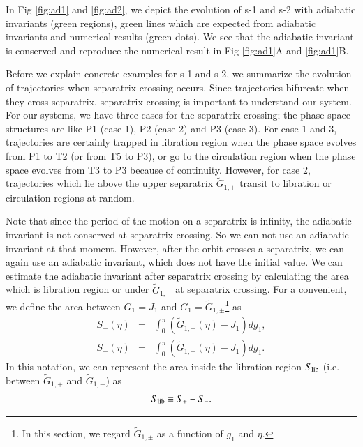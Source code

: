 \documentclass[useAMS,usenatbib,twocolumn]{mn2e}
\newcommand{\beqa}{\begin{eqnarray}}
\newcommand{\eeqa}{\end{eqnarray}}
\begin{document}
In Fig \ref{fig:ad1} and \ref{fig:ad2}, we depict
the evolution of s-1 and s-2 with adiabatic invariants (green
regions), green lines which are expected from adiabatic invariants and numerical results (green dots).
We see that the adiabatic invariant is conserved and reproduce the numerical result in Fig \ref{fig:ad1}A and \ref{fig:ad1}B.

Before we explain concrete examples for s-1 and s-2, we summarize the evolution of trajectories when separatrix crossing occurs. 
Since trajectories bifurcate when they cross separatrix, separatrix crossing is important to understand our system.
For our systems, we have three cases for the separatrix crossing; 
the phase space structures are like P1 (case 1), P2 (case 2) and P3 (case 3).
For case 1 and 3, trajectories are certainly trapped in libration region when the phase space evolves from P1 to T2 (or from T5 to P3), or go to the circulation region when the phase space evolves from T3 to P3 because of continuity.
However, for case 2, trajectories which lie above the upper separatrix $\tilde{G}_{1,+}$ transit to libration or circulation regions at random.

Note that since the period of the motion on a separatrix is infinity,
the adiabatic invariant is not conserved at separatrix crossing. 
So we can not use an adiabatic invariant at that moment.
However, after the orbit crosses a separatrix, we can again use
an adiabatic invariant, which does not have the initial value.
We can estimate the adiabatic invariant after separatrix crossing 
by calculating the area which is libration region or under $\tilde{G}_{1,-}$ at separatrix crossing.
For a convenient, we define the
area between $G_1=J_1$ and
$G_1=\tilde{G}_{1,\pm}$\footnote[1]{In this section, we regard
$\tilde{G}_{1, \pm}$ as a function of $g_1$ and $\eta$.}
as 
\beqa
S_{+}(\eta)&=&\int_{0}^{\pi} (\tilde{G}_{1,+}(\eta) - J_1) dg_{1},\\
S_{-}(\eta)&=&\int_{0}^{\pi} (\tilde{G}_{1, -}(\eta) - J_1) dg_{1}.
\eeqa
In this notation, we can represent the area inside the libration region $S_{\rm lib}$ (i.e. between $\tilde{G}_{1,+}$ and $\tilde{G}_{1,-}$) as
\beqa
S_{\rm lib} \equiv S_{+} - S_{-}.
\eeqa

\fi%



\end{document}
